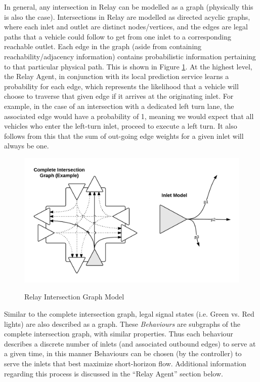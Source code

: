 \documentclass{report}
\begin{document}
In general, any intersection in Relay can be modelled as a graph (physically this is also the case).
Intersections in Relay are modelled as directed acyclic graphs, where each inlet and outlet are distinct nodes/vertices, and the edges are legal paths that a vehicle could follow to get from one inlet to a corresponding reachable outlet.
Each edge in the graph (aside from containing reachability/adjacency information) contains probabilistic information pertaining to that particular physical path.
This is shown in Figure \ref{fig:Relay_Intersection_Graph}.
At the highest level, the Relay Agent, in conjunction with its local prediction service learns a probability for each edge, which represents the likelihood that a vehicle will choose to traverse that given edge if it arrives at the originating inlet.
For example, in the case of an intersection with a dedicated left turn lane, the associated edge would have a probability of 1, meaning we would expect that all vehicles who enter the left-turn inlet, proceed to execute a left turn.
It also follows from this that the sum of out-going edge weights for a given inlet will always be one. \\

\begin{figure}[H]
	\caption{Relay Intersection Graph Model}
	\includegraphics[width=\textwidth]{figures/Relay_Intersection_Graph.png}
	\label{fig:Relay_Intersection_Graph}
\end{figure}

Similar to the complete intersection graph, legal signal states (i.e. Green vs. Red lights) are also described as a graph.
These \emph{Behaviours} are subgraphs of the complete intersection graph, with similar properties.
Thus each behaviour describes a discrete number of inlets (and associated outbound edges) to serve at a given time, in this manner Behaviours can be chosen (by the controller) to serve the inlets that best maximize short-horizon flow.
Additional information regarding this process is discussed in the ``Relay Agent'' section below.\\
\end{document}
